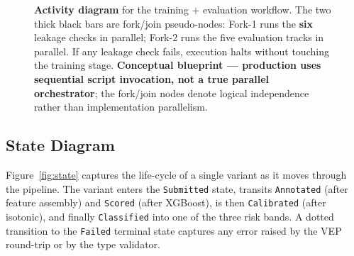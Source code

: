 \documentclass[11pt,a4paper,oneside]{report}
\begin{document}
\begin{figure}[htbp]
\caption[Activity diagram]{\textbf{Activity diagram} for the
training + evaluation workflow. The two thick black bars
are fork/join pseudo-nodes: Fork-1 runs the \textbf{six}
leakage checks in parallel; Fork-2 runs the five evaluation
tracks in parallel. If any leakage check fails, execution
halts without touching the training stage.
\textbf{Conceptual blueprint --- production uses sequential
script invocation, not a true parallel orchestrator}; the
fork/join nodes denote logical independence rather than
implementation parallelism.}
\label{fig:act}
\end{figure}

\subsection{State Diagram}
\label{sec:uml-state}

Figure~\ref{fig:state} captures the life-cycle of a single
variant as it moves through the pipeline. The variant
enters the \texttt{Submitted} state, transits
\texttt{Annotated} (after feature assembly) and
\texttt{Scored} (after XGBoost), is then
\texttt{Calibrated} (after isotonic), and finally
\texttt{Classified} into one of the three risk bands.
A dotted transition to the \texttt{Failed} terminal state
captures any error raised by the VEP round-trip or by the
type validator.
\end{document}
